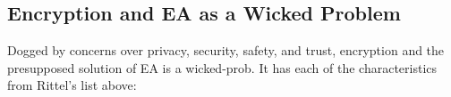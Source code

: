 


\subsection{Encryption and EA as a Wicked Problem}

Dogged by concerns over privacy, security, safety, and trust, \ac{encryption} and the presupposed solution of \ac{EA} is
a \ac{wicked-prob}. It has each of the characteristics from Rittel's list above:

